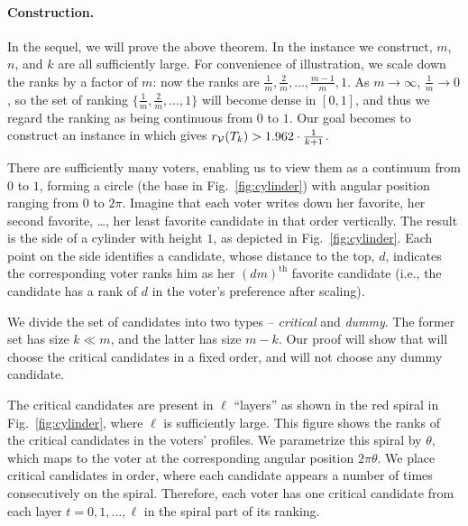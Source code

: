 
\paragraph{Construction.} In the sequel, we will prove the above theorem. In the instance we construct, $m$, $n$, and $k$ are all sufficiently large. For convenience of illustration, we scale down the ranks by a factor of $m$: now the ranks are $\frac{1}{m}, \frac{2}{m}, \ldots, \frac{m - 1}{m}, 1$. As $m \to \infty$, $\frac{1}{m} \to 0$, so the set of ranking $\{\frac{1}{m}, \frac{2}{m}, \ldots, 1\}$ will become dense in $[0, 1]$, and thus we regard the ranking as being continuous from $0$ to $1$. Our goal becomes to construct an instance in which \g{} gives $r_{\mathcal{V}}(T_k) > 1.962 \cdot \frac{1}{k + 1}$. %

There are sufficiently many voters, enabling us to view them as a continuum from $0$ to $1$, forming a circle (the base in Fig.~\ref{fig:cylinder}) with angular position ranging from $0$ to $2 \pi$. Imagine that each voter writes down her favorite, her second favorite, \ldots, her least favorite candidate in that order vertically. The result is the side of a cylinder with height $1$, as depicted in Fig.~\ref{fig:cylinder}. Each point on the side identifies a candidate, whose distance to the top, $d$, indicates the corresponding voter ranks him as her $(dm)^{\text{th}}$ favorite candidate (i.e., the candidate has a rank of $d$ in the voter's preference after scaling).




We divide the set of candidates into two types -- {\em critical} and {\em dummy}. The former set has size $k \ll m$, and the latter has size $m-k$. Our proof will show that \g{} will choose the critical candidates in a fixed order, and will not choose any dummy candidate.

The critical candidates are present in $\ell$ ``layers'' as shown in the red spiral in Fig.~\ref{fig:cylinder}, where $\ell$ is sufficiently large. This figure shows the ranks of the critical candidates in the voters' profiles. We parametrize this spiral by $\theta$, which maps to the voter at the corresponding angular position $2\pi\theta$. We place critical candidates in order, where each candidate appears a number of times consecutively on the spiral. Therefore, each voter has one critical candidate from each layer $t = 0, 1, \ldots, \ell$ in the spiral part of its ranking.

